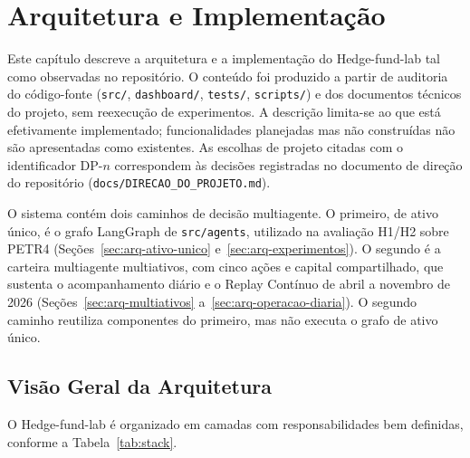 \chapter{Arquitetura e Implementação}
\label{cha:arquitetura}

Este capítulo descreve a arquitetura e a implementação do Hedge-fund-lab tal como observadas no repositório. O conteúdo foi produzido a partir de auditoria do código-fonte (\texttt{src/}, \texttt{dashboard/}, \texttt{tests/}, \texttt{scripts/}) e dos documentos técnicos do projeto, sem reexecução de experimentos. A descrição limita-se ao que está efetivamente implementado; funcionalidades planejadas mas não construídas não são apresentadas como existentes. As escolhas de projeto citadas com o identificador DP-$n$ correspondem às decisões registradas no documento de direção do repositório (\texttt{docs/DIRECAO\_DO\_PROJETO.md}).

O sistema contém dois caminhos de decisão multiagente. O primeiro, de ativo único, é o grafo LangGraph de \texttt{src/agents}, utilizado na avaliação H1/H2 sobre PETR4 (Seções~\ref{sec:arq-ativo-unico} e~\ref{sec:arq-experimentos}). O segundo é a carteira multiagente multiativos, com cinco ações e capital compartilhado, que sustenta o acompanhamento diário e o Replay Contínuo de abril a novembro de 2026 (Seções~\ref{sec:arq-multiativos} a~\ref{sec:arq-operacao-diaria}). O segundo caminho reutiliza componentes do primeiro, mas não executa o grafo de ativo único.

\section{Visão Geral da Arquitetura}

O Hedge-fund-lab é organizado em camadas com responsabilidades bem definidas, conforme a Tabela~\ref{tab:stack}.


